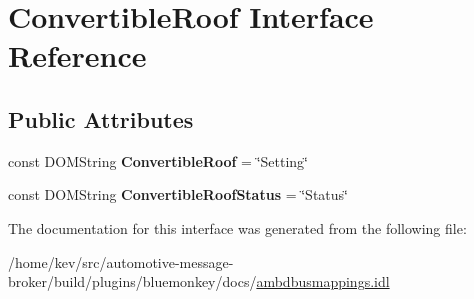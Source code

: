 \hypertarget{interfaceConvertibleRoof}{\section{Convertible\+Roof Interface Reference}
\label{interfaceConvertibleRoof}
}
\subsection*{Public Attributes}
\begin{DoxyCompactItemize}
\item 
\hypertarget{interfaceConvertibleRoof_a97b477822f789851b728735ad8122e6e}{const D\+O\+M\+String {\bfseries Convertible\+Roof} = \char`\"{}Setting\char`\"{}}\label{interfaceConvertibleRoof_a97b477822f789851b728735ad8122e6e}

\item 
\hypertarget{interfaceConvertibleRoof_a4fc60cf509edfff9f45cf2d024ed4e86}{const D\+O\+M\+String {\bfseries Convertible\+Roof\+Status} = \char`\"{}Status\char`\"{}}\label{interfaceConvertibleRoof_a4fc60cf509edfff9f45cf2d024ed4e86}

\end{DoxyCompactItemize}


The documentation for this interface was generated from the following file\+:\begin{DoxyCompactItemize}
\item 
/home/kev/src/automotive-\/message-\/broker/build/plugins/bluemonkey/docs/\hyperlink{ambdbusmappings_8idl}{ambdbusmappings.\+idl}\end{DoxyCompactItemize}
